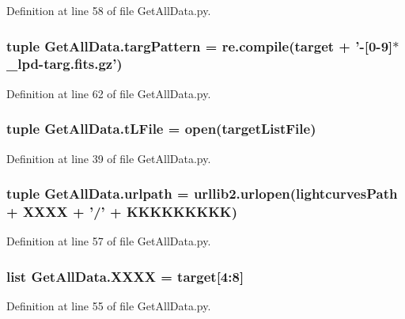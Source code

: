 Definition at line 58 of file Get\-All\-Data.\-py.

\hypertarget{namespace_get_all_data_ad05a0da5848b788cf7824b79fa516b64}{
\subsubsection[{targ\-Pattern}]{\setlength{\rightskip}{0pt plus 5cm}tuple Get\-All\-Data.\-targ\-Pattern = re.\-compile({\bf target} + '-\/\mbox{[}0-\/9\mbox{]}$\ast$\-\_\-lpd-\/targ.\-fits.\-gz')}}\label{namespace_get_all_data_ad05a0da5848b788cf7824b79fa516b64}


Definition at line 62 of file Get\-All\-Data.\-py.

\hypertarget{namespace_get_all_data_a7f0291de88ec75252bb7cfaa9a33997e}{
\subsubsection[{t\-L\-File}]{\setlength{\rightskip}{0pt plus 5cm}tuple Get\-All\-Data.\-t\-L\-File = open({\bf target\-List\-File})}}\label{namespace_get_all_data_a7f0291de88ec75252bb7cfaa9a33997e}


Definition at line 39 of file Get\-All\-Data.\-py.

\hypertarget{namespace_get_all_data_ae1e57e5321d57891fb95a9c9326c9713}{
\subsubsection[{urlpath}]{\setlength{\rightskip}{0pt plus 5cm}tuple Get\-All\-Data.\-urlpath = urllib2.\-urlopen({\bf lightcurves\-Path} + {\bf X\-X\-X\-X} + '/' + {\bf K\-K\-K\-K\-K\-K\-K\-K\-K})}}\label{namespace_get_all_data_ae1e57e5321d57891fb95a9c9326c9713}


Definition at line 57 of file Get\-All\-Data.\-py.

\hypertarget{namespace_get_all_data_a0ad0a5c98585457adf46115ebccbba6d}{
\subsubsection[{X\-X\-X\-X}]{\setlength{\rightskip}{0pt plus 5cm}list Get\-All\-Data.\-X\-X\-X\-X = {\bf target}\mbox{[}4\-:8\mbox{]}}}\label{namespace_get_all_data_a0ad0a5c98585457adf46115ebccbba6d}


Definition at line 55 of file Get\-All\-Data.\-py.

